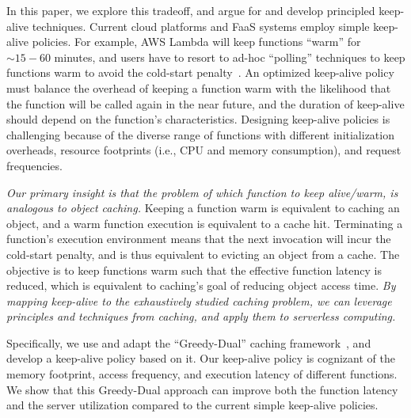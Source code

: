 In this paper, we explore this tradeoff, and argue for and develop principled keep-alive techniques. 
%
Current cloud platforms and FaaS systems employ simple keep-alive policies. 
%
For example, AWS Lambda will keep functions ``warm'' for $\sim 15-60$ minutes, and users have to resort to ad-hoc ``polling'' techniques to keep functions warm to avoid the cold-start penalty~\cite{lambda-warm, lambda-limits, lambda-warm-hour}. 
% 
An optimized keep-alive policy must balance the overhead of keeping a function warm with the likelihood that the function will be called again in the near future, and the duration of keep-alive should depend on the function's characteristics. 
%
Designing keep-alive policies is challenging because of the diverse range of functions with different initialization overheads, resource footprints (i.e., CPU and memory consumption),  and request frequencies. 
%


%
\emph{Our primary insight is that the problem of which function to keep alive/warm, is analogous to object caching.} 
% 
Keeping a function warm is equivalent to caching an object, and a warm function execution is equivalent to a cache hit. 
%
Terminating a function's execution environment means that the next invocation will incur the cold-start penalty, and is thus equivalent to evicting an object from a cache. 
% 
The objective is to keep functions warm such that the effective function latency is reduced, which is equivalent to caching's goal of reducing object access time. 
%
\emph{By mapping keep-alive to the exhaustively studied caching problem, we can leverage principles and techniques from caching, and apply them to serverless computing.}


%
Specifically, we use and adapt the ``Greedy-Dual'' caching framework~\cite{gdsf}, and develop a keep-alive policy based on it. 
%
Our keep-alive policy is cognizant of the memory footprint, access frequency, and execution latency of different functions. 
%
We show that this Greedy-Dual approach can improve both the function latency and the server utilization compared to the current simple keep-alive policies. 



%
%








